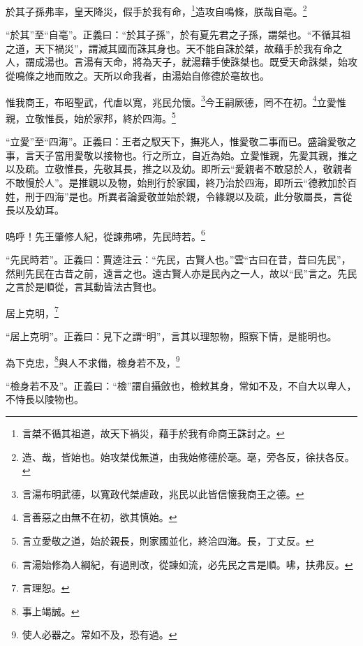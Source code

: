 於其子孫弗率，皇天降災，假手於我有命，\footnote{言桀不循其祖道，故天下禍災，藉手於我有命商王誅討之。}造攻自鳴條，朕哉自亳。\footnote{造、哉，皆始也。始攻桀伐無道，由我始修德於亳。亳，旁各反，徐扶各反。}

{\noindent\shu{}\fzkt “於其”至“自亳”。正義曰：“於其子孫”，於有夏先君之子孫，謂桀也。“不循其祖之道，天下禍災”，謂滅其國而誅其身也。天不能自誅於桀，故藉手於我有命之人，謂成湯也。言湯有天命，將為天子，就湯藉手使誅桀也。既受天命誅桀，始攻從鳴條之地而敗之。天所以命我者，由湯始自修德於亳故也。 \par}

惟我商王，布昭聖武，代虐以寬，兆民允懷。\footnote{言湯布明武德，以寬政代桀虐政，兆民以此皆信懷我商王之德。}今王嗣厥德，罔不在初。\footnote{言善惡之由無不在初，欲其慎始。}立愛惟親，立敬惟長，始於家邦，終於四海。\footnote{言立愛敬之道，始於親長，則家國並化，終洽四海。長，丁丈反。}

{\noindent\shu{}\fzkt “立愛”至“四海”。正義曰：王者之馭天下，撫兆人，惟愛敬二事而已。盛論愛敬之事，言天子當用愛敬以接物也。行之所立，自近為始。立愛惟親，先愛其親，推之以及疏。立敬惟長，先敬其長，推之以及幼。即所云“愛親者不敢惡於人，敬親者不敢慢於人”。是推親以及物，始則行於家國，終乃治於四海，即所云“德教加於百姓，刑于四海”是也。所異者論愛敬並始於親，令緣親以及疏，此分敬屬長，言從長以及幼耳。 \par}

嗚呼！先王肇修人紀，從諫弗咈，先民時若。\footnote{言湯始修為人綱紀，有過則改，從諫如流，必先民之言是順。咈，扶弗反。}

{\noindent\shu{}\fzkt “先民時若”。正義曰：賈逵注云：“先民，古賢人也。”雲“古曰在昔，昔曰先民”，然則先民在古昔之前，遠言之也。遠古賢人亦是民內之一人，故以“民”言之。先民之言於是順從，言其動皆法古賢也。 \par}

居上克明，\footnote{言理恕。}

{\noindent\shu{}\fzkt “居上克明”。正義曰：見下之謂“明”，言其以理恕物，照察下情，是能明也。 \par}

為下克忠，\footnote{事上竭誠。}與人不求備，檢身若不及，\footnote{使人必器之。常如不及，恐有過。}

{\noindent\shu{}\fzkt “檢身若不及”。正義曰：“檢”謂自攝斂也，檢敕其身，常如不及，不自大以卑人，不恃長以陵物也。 \par}

